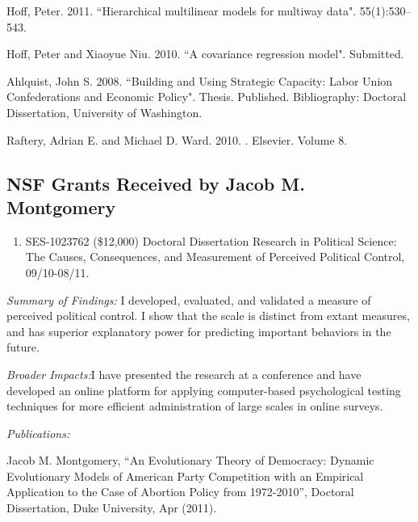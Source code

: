 \documentclass[pdftex,12pt,fullpage,oneside]{amsart}
\begin{document}
\begin{list}{}{\leftmargin=1em}
\item Hoff, Peter. 2011. ``Hierarchical multilinear models for multiway
  data".  55(1):530--543.

\item Hoff, Peter and Xiaoyue Niu. 2010. ``A covariance regression model".  Submitted.


\item  Ahlquist, John S. 2008. ``Building and Using Strategic Capacity: Labor Union Confederations and Economic Policy". Thesis. Published. %
Bibliography: Doctoral Dissertation, University of Washington.

\item  Raftery, Adrian E. and Michael D. Ward. 2010. . %
Elsevier. Volume 8.
\end{list}

 \subsection{NSF Grants Received by Jacob M. Montgomery}
\begin{enumerate}
\item SES-1023762  (\$12,000) Doctoral Dissertation Research in Political Science: The Causes, Consequences, and Measurement of Perceived Political Control, 09/10-08/11.    
\end{enumerate}

\textit{Summary of Findings:} I developed, evaluated, and validated a
measure of perceived political control. I show that the scale is
distinct from extant measures, and has superior explanatory power for
predicting important behaviors in the future. 

\textit{Broader Impacts:}I have presented the research at a
conference and have developed an online platform for applying
computer-based psychological testing techniques for more efficient
administration of large scales in online surveys.

\textit{Publications:}

\begin{list}{}{\leftmargin=1em} \small
\item Jacob M. Montgomery, ``An Evolutionary Theory of Democracy:
  Dynamic Evolutionary Models of American Party Competition with an
  Empirical Application to the Case of Abortion Policy from
  1972-2010'', Doctoral Dissertation, Duke University, Apr (2011).
\end{list}
\end{document}
